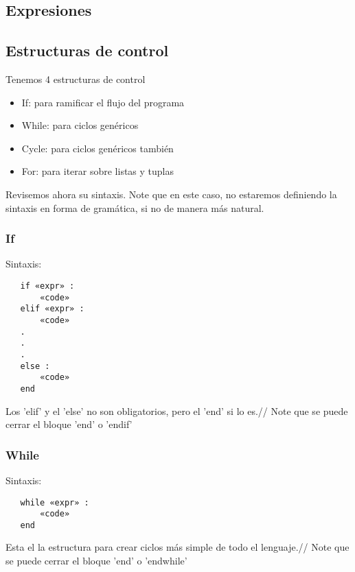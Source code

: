 \documentclass[12pt, spanish]{report}
\begin{document}
\subsection{Expresiones}
\label{sec:expr}

\subsection{Estructuras de control}
\label{sec:ecntrl}
Tenemos 4 estructuras de control
\begin{itemize}
\item If: para ramificar el flujo del programa
\item While: para ciclos gen\'ericos
\item Cycle: para ciclos gen\'ericos tambi\'en
\item For: para iterar sobre listas y tuplas
\end{itemize}

Revisemos ahora su sintaxis. Note que en este caso, no estaremos
definiendo la sintaxis en forma de gramática, si no de manera más natural.

\subsubsection{If}
Sintaxis:
\begin{verbatim}
   if «expr» :
       «code»
   elif «expr» :
       «code»
   .
   .
   .
   else :
       «code»
   end
\end{verbatim}
Los 'elif' y el 'else' no son obligatorios, pero el 'end' si lo es.//
Note que se puede cerrar el bloque 'end' o 'endif'

\subsubsection{While}
Sintaxis:
\begin{verbatim}
   while «expr» :
       «code»
   end
\end{verbatim}

Esta el la estructura para crear ciclos más simple de todo el lenguaje.//
Note que se puede cerrar el bloque 'end' o 'endwhile'
\end{document}

